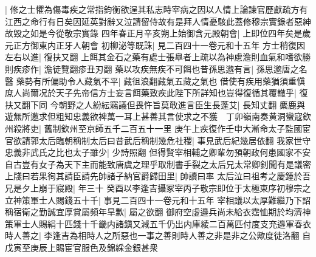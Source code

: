 |{
	修之士懼為傷毒疾之常指鈞衡欲逞其私志時宰病之因以人情上論諫官歷獻疏方有江西之命行有日矣因延英對辭又泣請留侍故有是拜人情憂駭此蓋修穆宗實錄者惡紳故毁之如是今從敬宗實錄}
四年春正月辛亥朔上始御含元殿朝會|{
	上即位四年矣是歲元正方御東内正牙人朝會}
初柳泌等既誅|{
	見二百四十一卷元和十五年}
方士稍復因左右以進|{
	復扶又翻}
上餌其金石之藥有處士張臯者上疏以為神慮澹則血氣和嗜欲勝則疾疹作|{
	澹徒覽翻疹丑刃翻}
藥以攻疾無疾不可餌也昔孫思邈有言|{
	孫思邈唐之名醫}
藥勢有所偏助令人藏氣不平|{
	藏徂浪翻藏氣五藏之氣也}
借使有疾用藥猶須重愼庶人尚爾况於天子先帝信方士妄言餌藥致疾此陛下所詳知也豈得復循其覆轍乎|{
	復扶又翻下同}
今朝野之人紛紜竊議但畏忤旨莫敢進言臣生長蓬艾|{
	長知丈翻}
麋鹿與遊無所邀求但粗知忠義欲裨萬一耳上甚善其言使求之不獲　丁卯嶺南奏黄洞蠻寇欽州殺將吏|{
	舊制欽州至京師五千二百五十一里}
庚午上疾復作壬申大漸命太子監國宦官欲請郭太后臨朝稱制太后曰昔武后稱制幾危社稷|{
	事見武后紀幾居依翻}
我家世守忠義非武氏之比也太子雖少|{
	少詩照翻}
但得賢宰相輔之卿輩勿預朝政何患國家不安自古豈有女子為天下主而能致唐虞之理乎取制書手裂之太后兄太常卿釗聞有是議密上牋曰若果徇其請臣請先帥諸子納官爵歸田里|{
	帥讀曰率}
太后泣曰祖考之慶鍾於吾兄是夕上崩于寢殿|{
	年三十}
癸酉以李逢吉攝冢宰丙子敬宗即位于太極東序初穆宗之立神策軍士人賜錢五十千|{
	事見二百四十一卷元和十五年}
宰相議以太厚難繼乃下詔稱宿衛之勤誠宜厚賞屬頻年旱歉|{
	屬之欲翻}
御府空虚邉兵尚未給衣霑恤期於均濟神策軍士人賜絹十匹錢十千畿内諸鎭又減五千仍出内庫綾二百萬匹付度支充邉軍春衣時人善之|{
	李逢吉為相時人之所惡也一事之善則時人善之非是非之公歟度徒洛翻}
自戊寅至庚辰上賜宦官服色及錦綵金銀甚衆

